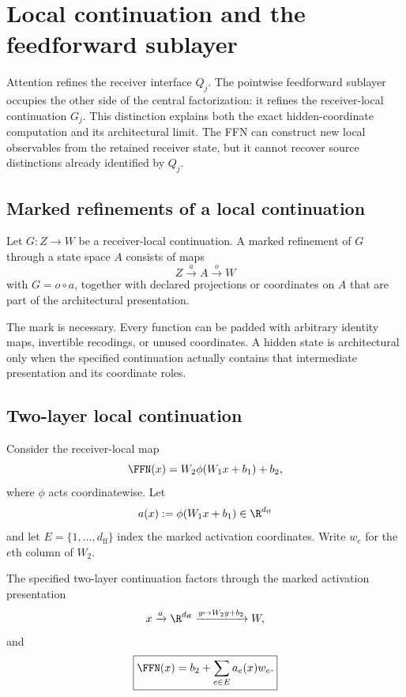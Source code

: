 \section{Local continuation and the feedforward sublayer}\label{sec:local-continuation}

Attention refines the receiver interface $Q_j$. The pointwise feedforward sublayer occupies the other side of the central factorization: it refines the receiver-local continuation $G_j$. This distinction explains both the exact hidden-coordinate computation and its architectural limit. The FFN can construct new local observables from the retained receiver state, but it cannot recover source distinctions already identified by $Q_j$.

\subsection{Marked refinements of a local continuation}

\begin{definition}\label{def:local-continuation-refinement}
Let $G:Z\to W$ be a receiver-local continuation. A marked refinement of $G$ through a state space $A$ consists of maps
\[
Z\xrightarrow{a}A\xrightarrow{o}W
\]
with $G=o\circ a$, together with declared projections or coordinates on $A$ that are part of the architectural presentation.
\end{definition}

The mark is necessary. Every function can be padded with arbitrary identity maps, invertible recodings, or unused coordinates. A hidden state is architectural only when the specified continuation actually contains that intermediate presentation and its coordinate roles.

\subsection{Two-layer local continuation}

Consider the receiver-local map
\begin{equation}\label{eq:ffn}
\FFN(x)=W_2\phi(W_1x+b_1)+b_2,
\end{equation}
where $\phi$ acts coordinatewise. Let
\[
a(x):=\phi(W_1x+b_1)\in\R^{d_{\mathrm{ff}}}
\]
and let $E=\{1,\ldots,d_{\mathrm{ff}}\}$ index the marked activation coordinates. Write $w_e$ for the $e$th column of $W_2$.

\begin{proposition}\label{prop:ffn-hidden-carrier}
The specified two-layer continuation factors through the marked activation presentation
\[
x\xrightarrow{a}\R^{d_{\mathrm{ff}}}\xrightarrow{y\mapsto W_2y+b_2}W,
\]
and
\begin{equation}\label{eq:ffn-direction-sum}
\boxed{\FFN(x)=b_2+\sum_{e\in E}a_e(x)w_e.}
\end{equation}
\end{proposition}


